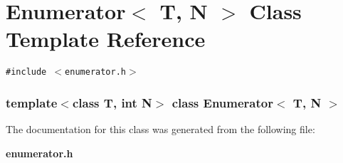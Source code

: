 \section{Enumerator$<$ T, N $>$ Class Template Reference}
\label{classEnumerator}
{\tt \#include $<$enumerator.h$>$}

\subsubsection*{template$<$class T, int N$>$ class Enumerator$<$ T, N $>$}



The documentation for this class was generated from the following file:\begin{CompactItemize}
\item 
{\bf enumerator.h}\end{CompactItemize}
